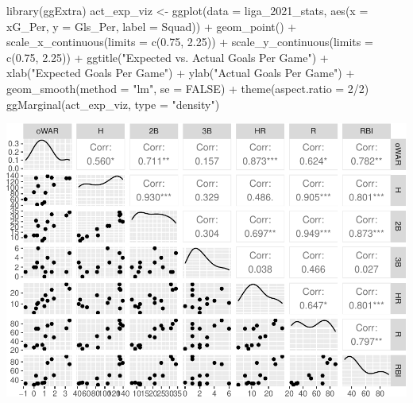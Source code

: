 \documentclass[
  11pt,
]{book}
\newenvironment{Shaded}{\begin{snugshade}}{\end{snugshade}}
\newcommand{\AttributeTok}[1]{\textcolor[rgb]{0.77,0.63,0.00}{#1}}
\newcommand{\ConstantTok}[1]{\textcolor[rgb]{0.00,0.00,0.00}{#1}}
\newcommand{\DecValTok}[1]{\textcolor[rgb]{0.00,0.00,0.81}{#1}}
\newcommand{\FloatTok}[1]{\textcolor[rgb]{0.00,0.00,0.81}{#1}}
\newcommand{\FunctionTok}[1]{\textcolor[rgb]{0.00,0.00,0.00}{#1}}
\newcommand{\NormalTok}[1]{#1}
\newcommand{\OtherTok}[1]{\textcolor[rgb]{0.56,0.35,0.01}{#1}}
\newcommand{\SpecialCharTok}[1]{\textcolor[rgb]{0.00,0.00,0.00}{#1}}
\newcommand{\StringTok}[1]{\textcolor[rgb]{0.31,0.60,0.02}{#1}}
\theoremstyle{definition}
\theoremstyle{definition}
\theoremstyle{definition}
\theoremstyle{definition}
\theoremstyle{remark}
\begin{document}
\begin{Shaded}
\begin{Highlighting}[]
\FunctionTok{library}\NormalTok{(ggExtra)}
\NormalTok{act\_exp\_viz }\OtherTok{\textless{}{-}} \FunctionTok{ggplot}\NormalTok{(}\AttributeTok{data =}\NormalTok{ liga\_2021\_stats, }\FunctionTok{aes}\NormalTok{(}\AttributeTok{x =}\NormalTok{ xG\_Per, }\AttributeTok{y =}\NormalTok{ Gls\_Per, }\AttributeTok{label =}\NormalTok{ Squad)) }\SpecialCharTok{+}
    \FunctionTok{geom\_point}\NormalTok{() }\SpecialCharTok{+} \FunctionTok{scale\_x\_continuous}\NormalTok{(}\AttributeTok{limits =} \FunctionTok{c}\NormalTok{(}\FloatTok{0.75}\NormalTok{, }\FloatTok{2.25}\NormalTok{)) }\SpecialCharTok{+} \FunctionTok{scale\_y\_continuous}\NormalTok{(}\AttributeTok{limits =} \FunctionTok{c}\NormalTok{(}\FloatTok{0.75}\NormalTok{,}
    \FloatTok{2.25}\NormalTok{)) }\SpecialCharTok{+} \FunctionTok{ggtitle}\NormalTok{(}\StringTok{"Expected vs. Actual Goals Per Game"}\NormalTok{) }\SpecialCharTok{+} \FunctionTok{xlab}\NormalTok{(}\StringTok{"Expected Goals Per Game"}\NormalTok{) }\SpecialCharTok{+}
    \FunctionTok{ylab}\NormalTok{(}\StringTok{"Actual Goals Per Game"}\NormalTok{) }\SpecialCharTok{+} \FunctionTok{geom\_smooth}\NormalTok{(}\AttributeTok{method =} \StringTok{"lm"}\NormalTok{, }\AttributeTok{se =} \ConstantTok{FALSE}\NormalTok{) }\SpecialCharTok{+} \FunctionTok{theme}\NormalTok{(}\AttributeTok{aspect.ratio =} \DecValTok{2}\SpecialCharTok{/}\DecValTok{2}\NormalTok{)}
\FunctionTok{ggMarginal}\NormalTok{(act\_exp\_viz, }\AttributeTok{type =} \StringTok{"density"}\NormalTok{)}
\end{Highlighting}
\end{Shaded}

\includegraphics{series_files/figure-latex/unnamed-chunk-16-1.pdf}
\end{document}
